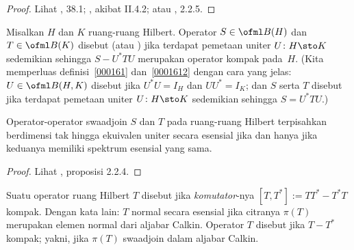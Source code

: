 \begin{proof} Lihat \cite{Conway:2000}, 38.1; \cite{Davidson:1996}, akibat II.4.2; atau
\cite{HigsonR:2000}, 2.2.5. \ns
\end{proof}

\begin{defn} Misalkan $H$ dan $K$ ruang-ruang Hilbert. Operator $S \in \ofml B(H)$ dan $T \in \ofml
B(K)$ disebut
 (atau
) jika terdapat pemetaan uniter $U\colon H \sto K$ sedemikian sehingga $S - U^*TU$
merupakan operator kompak pada~$H$. (Kita memperluas definisi~\ref{000161} dan~\ref{0001612} dengan
cara yang jelas: $U \in \ofml B(H,K)$ disebut
 jika $U^*U = I_H$ dan $UU^* = I_K$; dan $S$ serta $T$ disebut
 jika terdapat pemetaan uniter $U\colon H \sto K$ sedemikian sehingga $S =
U^*TU$.)
\end{defn}

\begin{prop}\label{005134} Operator-operator swaadjoin $S$ dan $T$ pada ruang-ruang Hilbert terpisahkan berdimensi tak hingga
ekuivalen uniter secara esensial jika dan hanya jika keduanya memiliki spektrum esensial yang sama.
\end{prop}

\begin{proof} Lihat \cite{HigsonR:2000}, proposisi 2.2.4.  \ns \end{proof}

\begin{defn} Suatu operator ruang Hilbert $T$ disebut
 jika
\emph{komutator}-nya $[T,T^*] := TT^* - T^*T$ kompak. Dengan kata lain: $T$ normal secara
esensial jika citranya $\pi(T)$ merupakan elemen normal dari aljabar Calkin. Operator $T$
disebut
 jika $T - T^*$ kompak; yakni, jika $\pi(T)$
swaadjoin dalam aljabar Calkin.
\end{defn}


